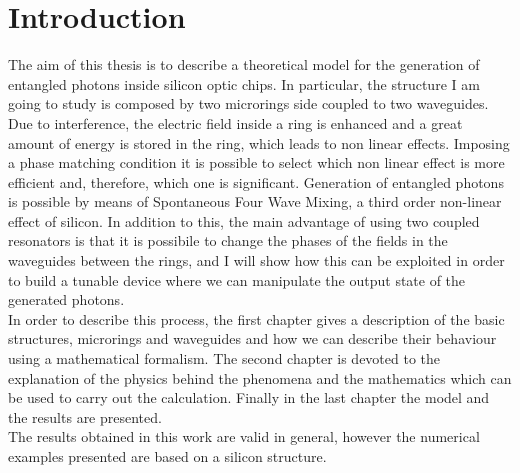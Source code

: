\chapter{Introduction}
The aim of this thesis is to describe a theoretical model for the generation of entangled photons inside silicon optic chips. In particular, the structure I am going to study is composed by two microrings side coupled to two waveguides. Due to interference, the electric field inside a ring is enhanced and a great amount of energy is stored in the ring, which leads to non linear effects. Imposing a phase matching condition it is possible to select which non linear effect is more efficient and, therefore, which one is significant. Generation of entangled photons is possible by means of Spontaneous Four Wave Mixing, a third order non-linear effect of silicon.
In addition to this, the main advantage of using two coupled resonators is that it is possibile to change the phases of the fields in the waveguides between the rings, and I will show how this can be exploited in order to build a tunable device where we can manipulate the output state of the generated photons.
\\
In order to describe this process, the first chapter gives a description of the basic structures, microrings and waveguides and how we can describe their behaviour using a mathematical formalism. The second chapter is devoted to the explanation of the physics behind the phenomena and the mathematics which can be used to carry out the calculation. Finally in the last chapter the model and the results are presented.\\
The results obtained in this work are valid in general, however the numerical examples presented are based on a silicon structure.
